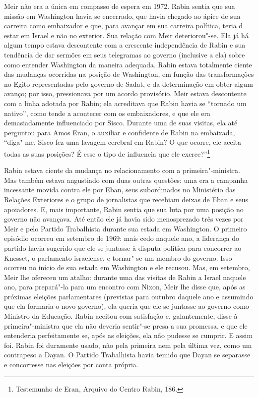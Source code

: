 Meir não era a única em compasso de espera em 1972. Rabin sentia que sua
missão em Washington havia se encerrado, que havia chegado ao ápice de
sua carreira como embaixador e que, para avançar em sua carreira política,
teria d estar em Israel e não no exterior. Sua relação com Meir
deteriorou"-se. Ela já há algum tempo estava descontente com a crescente
independência de Rabin e sua tendência de dar sermões em seus telegramas
ao governo (inclusive a ela) sobre como entender Washington da maneira
adequada. Rabin estava totalmente ciente das mudanças ocorridas na
posição de Washington, em função das transformações no Egito
representadas pelo governo de Sadat, e da determinação em obter algum
avanço; por isso, pressionava por um acordo provisório. Meir estava
descontente com a linha adotada por Rabin; ela acreditava que Rabin
havia se ``tornado um nativo'', como tende a acontecer com os
embaixadores, e que ele era demasiadamente influenciado por Sisco.
Durante uma de suas visitas, ela até perguntou para Amos Eran, o auxiliar
e confidente de Rabin na embaixada, ``diga"-me, Sisco fez uma lavagem
cerebral em Rabin? O que ocorre, ele aceita todas as suas posições? É
esse o tipo de influencia que ele exerce?''\footnote{Testemunho de Eran, Arquivo do Centro Rabin, 186.}

Rabin estava ciente da mudança no relacionamento com a primeira"-ministra.
Mas também estava angustiado com duas outras questões: uma era
a campanha incessante movida contra ele por Eban, seus subordinados no
Ministério das Relações Exteriores e o grupo de jornalistas que recebiam
deixas de Eban e seus apoiadores. E, mais importante, Rabin sentia que sua
luta por uma posição no governo não avançava. Até então ele já havia
sido menosprezado três vezes por Meir e pelo Partido Trabalhista
durante sua estada em Washington. O primeiro episódio ocorreu em
setembro de 1969: mais cedo naquele ano, a liderança do partido havia
sugerido que ele se juntasse à disputa política para concorrer ao
Knesset, o parlamento israelense, e tornar"-se um membro do governo. Isso
ocorreu no início de sua estada em Washington e ele recusou. Mas, em
setembro, Meir lhe ofereceu um atalho: durante uma das visitas de Rabin
a Israel naquele ano, para prepará"-la para um encontro com Nixon, Meir
lhe disse que, após as próximas eleições parlamentares (previstas para
outubro daquele ano e assumindo que ela formaria o novo governo), ela
queria que ele se juntasse ao governo como Ministro da Educação. Rabin
aceitou com satisfação e, galantemente, disse à primeira"-ministra que
ela não deveria sentir"-se presa a sua promessa, e que ele entenderia
perfeitamente se, após as eleições, ela não pudesse se cumprir. E
assim foi. Rabin foi duramente usado, não pela primeira nem pela
última vez, como um contrapeso a Dayan. O Partido Trabalhista havia
temido que Dayan se separasse e concorresse nas eleições por conta
própria.

